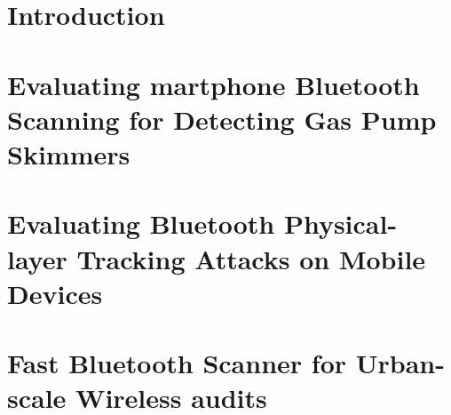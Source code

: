 \documentclass[12pt]{ucsddissertation}
\begin{document}
\frontmatter
\maketitle
\makecopyright
\makesignature



\tableofcontents
\listoffigures
\listoftables









\mainmatter

\chapter{Introduction}


%

\chapter{Evaluating martphone Bluetooth Scanning for Detecting Gas Pump Skimmers}


\chapter{Evaluating Bluetooth Physical-layer Tracking Attacks on Mobile Devices}


\chapter{Fast Bluetooth Scanner for Urban-scale Wireless audits}

\appendix

\backmatter

\end{document}
